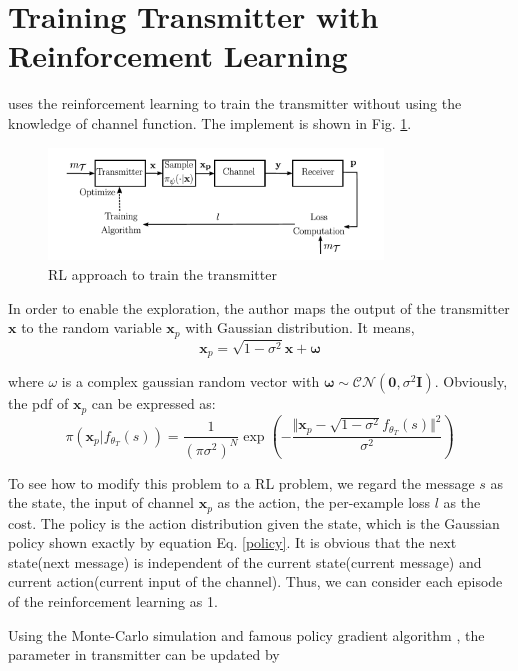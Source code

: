 \documentclass[12pt,a4paper]{article}
\begin{document}
	\section{Training Transmitter with Reinforcement Learning}
	\noindent
	\par \citep{8645416} uses the reinforcement learning to train the transmitter without using the knowledge of channel function. The implement is shown in Fig. \ref{RL}. 
	\begin{figure}[h] \label{RL}
		\centering
		\includegraphics[width=3.5in]{RL.png}
		\caption{RL approach to train the transmitter}
	\end{figure}
	\par In order to enable the exploration, the author maps the output of the transmitter $\bm{x}$ to the random variable $\bm{x}_p$ with Gaussian distribution. It means,
	\begin{equation}
		\bm{x}_p=\sqrt{1-\sigma^2}\bm{x}+\bm{\omega}
	\end{equation}
	\par where $\omega$ is a complex gaussian random vector with $\bm{\omega}\sim\mathcal{CN}(\bm{0},\sigma^2\mathbf{I})$. Obviously, the pdf of $\bm{x}_p$ can be expressed as:
	\begin{equation} \label{policy}
		\pi(\bm{x}_p\vert f_{\theta_T}(s))=\frac{1}{(\pi\sigma^2)^N}\exp(-\frac{\Vert\bm{x}_p-\sqrt{1-\sigma^2}f_{\theta_T}(s)\Vert^2}{\sigma^2})
	\end{equation}
	\par To see how to modify this problem to a RL problem, we regard the message $s$ as the state, the input of channel $\bm{x}_p$ as the action, the per-example loss $l$ as the cost. The policy is the action distribution given the state, which is the Gaussian policy shown exactly by equation Eq. \eqref{policy}. It is obvious that the next state(next message) is independent of the current state(current message) and current action(current input of the channel). Thus, we can consider each episode of the reinforcement learning as 1. 
	\par Using the Monte-Carlo simulation and famous policy gradient algorithm \citep{Sutton1998}, the parameter in transmitter can be updated by
\end{document}
